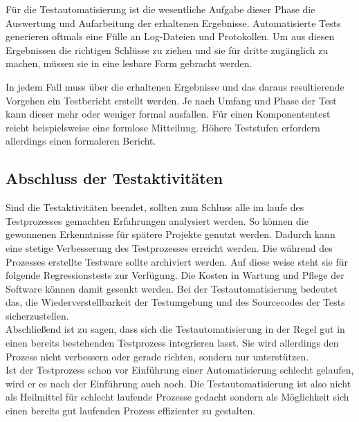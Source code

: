Für die Testautomatisierung ist die wesentliche Aufgabe dieser Phase die Auswertung und Aufarbeitung der erhaltenen Ergebnisse. Automatisierte Tests generieren oftmals eine Fülle an Log-Dateien und Protokollen. Um aus diesen Ergebnissen die richtigen Schlüsse zu ziehen und sie für dritte zugänglich zu machen, müssen sie in eine lesbare Form gebracht werden.

In jedem Fall muss über die erhaltenen Ergebnisse und das daraus resultierende Vorgehen ein Testbericht erstellt werden. Je nach Umfang und Phase der Test kann dieser mehr oder weniger formal ausfallen. Für einen Komponententest reicht beispielsweise eine formlose Mitteilung. Höhere Teststufen erfordern allerdings einen formaleren Bericht.



\subsection{Abschluss der Testaktivitäten}
\label{subsec:abschluss_der_testaktivitäten}
Sind die Testaktivitäten beendet, sollten zum Schluss alle im laufe des Testprozesses gemachten Erfahrungen analysiert werden. So können die gewonnenen Erkenntnisse für spätere Projekte genutzt werden. Dadurch kann eine stetige Verbesserung des Testprozesses erreicht werden.
Die während des Prozesses erstellte Testware sollte archiviert werden. Auf diese weise steht sie für folgende Regressionstests zur Verfügung. Die Kosten in Wartung und Pflege der Software können damit gesenkt werden.
Bei der Testautomatisierung bedeutet das, die Wiederverstellbarkeit der Testumgebung und des Sourcecodes der Tests sicherzustellen.
\newline\\
Abschließend ist zu sagen, dass sich die Testautomatisierung in der Regel gut in einen bereits bestehenden Testprozess integrieren lasst. Sie wird allerdings \glqq den Prozess nicht verbessern oder gerade richten, sondern nur unterstützen.\grqq\ \cite[S.21]{seidl_basiswissen_2012} \\ Ist der Testprozess schon vor Einführung einer Automatisierung schlecht gelaufen, wird er es nach der Einführung auch noch.
Die Testautomatisierung ist also nicht als Heilmittel für schlecht laufende Prozesse gedacht sondern als Möglichkeit sich einen bereits gut laufenden Prozess effizienter zu gestalten.

